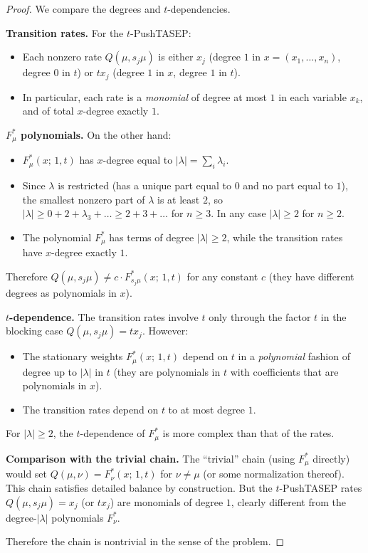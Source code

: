 \documentclass[12pt]{article}
\theoremstyle{definition}
\begin{document}
\begin{proof}
We compare the degrees and $t$-dependencies.

\textbf{Transition rates.}  For the $t$-PushTASEP:
\begin{itemize}
\item Each nonzero rate $Q(\mu, s_j\mu)$ is either $x_j$ (degree $1$ in
  $x = (x_1,\dots,x_n)$, degree $0$ in $t$) or $tx_j$ (degree $1$ in $x$,
  degree $1$ in $t$).
\item In particular, each rate is a \emph{monomial} of degree at most $1$ in
  each variable $x_k$, and of total $x$-degree exactly $1$.
\end{itemize}

\textbf{$F^*_\mu$ polynomials.}  On the other hand:
\begin{itemize}
\item $F^*_\mu(x;\,1,t)$ has $x$-degree equal to $|\lambda| = \sum_i \lambda_i$.
\item Since $\lambda$ is restricted (has a unique part equal to $0$ and no part
  equal to $1$), the smallest nonzero part of $\lambda$ is at least $2$, so
  $|\lambda| \geq 0 + 2 + \lambda_3 + \dots \geq 2 + 3 + \dots$ for $n \geq 3$.
  In any case $|\lambda| \geq 2$ for $n \geq 2$.
\item The polynomial $F^*_\mu$ has terms of degree $|\lambda| \geq 2$, while
  the transition rates have $x$-degree exactly $1$.
\end{itemize}

Therefore $Q(\mu, s_j\mu) \neq c \cdot F^*_{s_j\mu}(x;\,1,t)$ for any constant
$c$ (they have different degrees as polynomials in $x$).

\textbf{$t$-dependence.}  The transition rates involve $t$ only through the
factor $t$ in the blocking case $Q(\mu,s_j\mu) = tx_j$.  However:
\begin{itemize}
\item The stationary weights $F^*_\mu(x;\,1,t)$ depend on $t$ in a
  \emph{polynomial} fashion of degree up to $|\lambda|$ in $t$ (they are
  polynomials in $t$ with coefficients that are polynomials in $x$).
\item The transition rates depend on $t$ to at most degree $1$.
\end{itemize}
For $|\lambda| \geq 2$, the $t$-dependence of $F^*_\mu$ is more complex than
that of the rates.

\textbf{Comparison with the trivial chain.}  The ``trivial'' chain (using
$F^*_\mu$ directly) would set $Q(\mu, \nu) = F^*_\nu(x;\,1,t)$ for $\nu \neq
\mu$ (or some normalization thereof).  This chain satisfies detailed balance by
construction.  But the $t$-PushTASEP rates $Q(\mu, s_j\mu) = x_j$ (or $tx_j$)
are monomials of degree $1$, clearly different from the degree-$|\lambda|$
polynomials $F^*_\nu$.

Therefore the chain is nontrivial in the sense of the problem.
\end{proof}
\end{document}
